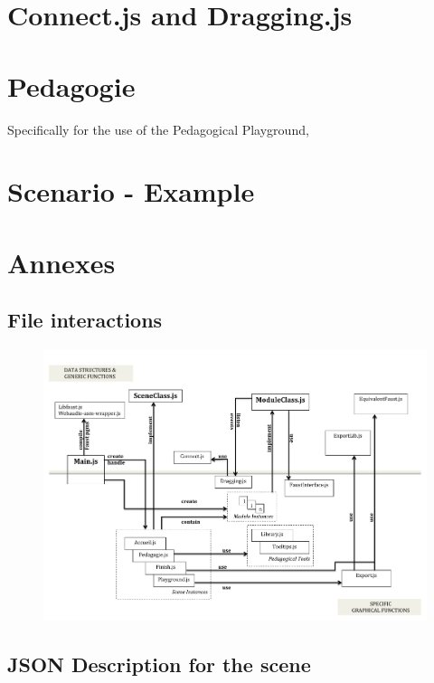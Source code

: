 \documentclass[a4paper]{article}
\begin{document}
\section{Connect.js and Dragging.js}


\section{Pedagogie}
Specifically for the use of the Pedagogical Playground,



\section{Scenario - Example}

\section{Annexes}
\subsection{File interactions}
\begin{landscape}
\begin{figure}[!h]
\begin{center}
\includegraphics[width=\columnwidth]{images/ClassDiagram.pdf}
\label{fig:classes}
\end{center}
\end{figure}
\end{landscape}

\subsection{JSON Description for the scene}
\end{document}
